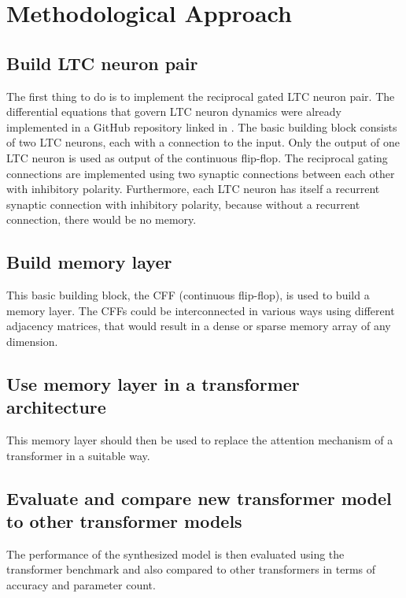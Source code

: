 \documentclass{article}
\begin{document}
    \section{Methodological Approach}

    \subsection{Build LTC neuron pair}
    The first thing to do is to implement the reciprocal gated LTC neuron pair.
    The differential equations that govern LTC neuron dynamics were already implemented in a GitHub repository linked in \cite{NCP}. The basic building block consists of two LTC neurons, each with a connection to the input.
    Only the output of one LTC neuron is used as output of the continuous flip-flop.
    The reciprocal gating connections are implemented using two synaptic connections between each other with inhibitory polarity.
    Furthermore, each LTC neuron has itself a recurrent synaptic connection with inhibitory polarity, because without a recurrent connection, there would be no memory.

    \subsection{Build memory layer}
    This basic building block, the CFF (continuous flip-flop), is used to build a memory layer.
    The CFFs could be interconnected in various ways using different adjacency matrices, that would result in a dense or sparse memory array of any dimension.

    \subsection{Use memory layer in a transformer architecture}
    This memory layer should then be used to replace the attention mechanism of a transformer in a suitable way.

    \subsection{Evaluate and compare new transformer model to other transformer models}
    The performance of the synthesized model is then evaluated using the transformer benchmark \cite{TransformerBenchmark} and also compared to other transformers in terms of accuracy and parameter count.
\end{document}
